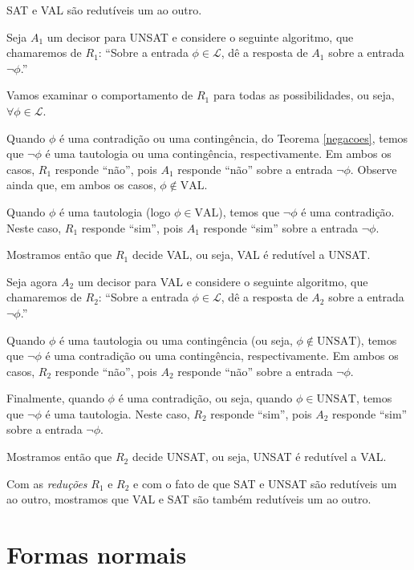 \begin{theorem}
	\label{satval}
	SAT e VAL são redutíveis um ao outro.
\end{theorem}

\begin{prova}
Seja $A_1$ um decisor para UNSAT e considere o seguinte algoritmo, que chamaremos de $R_1$: ``Sobre a entrada $\phi \in \mathcal{L}$, dê a resposta de $A_1$ sobre a entrada $\neg \phi$.''

Vamos examinar o comportamento de $R_1$ para todas as possibilidades, ou seja, $\forall \phi \in \mathcal{L}$.

Quando $\phi$ é uma contradição ou uma contingência, do Teorema \ref{negacoes}, temos que $\neg \phi$ é uma tautologia ou uma contingência, respectivamente. Em ambos os casos, $R_1$ responde ``não'', pois $A_1$ responde ``não'' sobre a entrada $\neg \phi$. Observe ainda que, em ambos os casos, $\phi \notin \text{VAL}$.

Quando $\phi$ é uma tautologia (logo $\phi \in \text{VAL}$), temos que $\neg \phi$ é uma contradição. Neste caso, $R_1$ responde ``sim'', pois $A_1$ responde ``sim'' sobre a entrada $\neg \phi$.

Mostramos então que $R_1$ decide VAL, ou seja, VAL é redutível a UNSAT.

Seja agora $A_2$ um decisor para VAL e considere o seguinte algoritmo, que chamaremos de $R_2$: ``Sobre a entrada $\phi \in \mathcal{L}$, dê a resposta de $A_2$ sobre a entrada $\neg \phi$.''

Quando $\phi$ é uma tautologia ou uma contingência (ou seja, $\phi \notin \text{UNSAT}$), temos que $\neg \phi$ é uma contradição ou uma contingência, respectivamente. Em ambos os casos, $R_2$ responde ``não'', pois $A_2$ responde ``não'' sobre a entrada $\neg \phi$.

Finalmente, quando $\phi$ é uma contradição, ou seja, quando $\phi \in \text{UNSAT}$, temos que $\neg \phi$ é uma tautologia. Neste caso, $R_2$ responde ``sim'', pois $A_2$ responde ``sim'' sobre a entrada $\neg \phi$.

Mostramos então que $R_2$ decide UNSAT, ou seja, UNSAT é redutível a VAL.

Com as \emph{reduções} $R_1$ e $R_2$ e com o fato de que SAT e UNSAT são redutíveis um ao outro, mostramos que VAL e SAT são também redutíveis um ao outro.
\end{prova}

\section{Formas normais}

